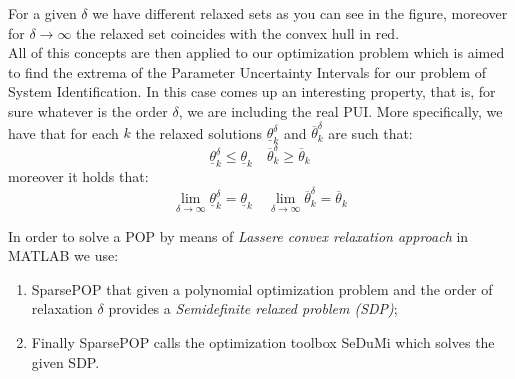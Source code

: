 For a given $\delta$ we have different relaxed sets as you can see in the figure, moreover for $\delta\to\infty$ the relaxed set coincides with the convex hull in red.\\
All of this concepts are then applied to our optimization problem which is aimed to find the extrema of the Parameter Uncertainty Intervals for our problem of System Identification. In this case comes up an interesting property, that is, for sure whatever is the order $\delta$, we are including the real PUI. More specifically, we have that for each $k$ the relaxed solutions $\underline{\theta}_k^{\delta}$ and $\overline{\theta}_k^{\delta}$ are such that:
{\large{
    \begin{equation}
        \underline{\theta}_k^{\delta} \le \underline{\theta}_k
        \quad 
        \overline{\theta}_k^{\delta} \ge \overline{\theta}_k
    \end{equation}
}}
moreover it holds that: 
\begin{equation}
    \lim_{\delta\to\infty} \underline{\theta}_k^{\delta} = \underline{\theta}_k \quad
    \lim_{\delta\to\infty} \overline{\theta}_k^{\delta} = \overline{\theta}_k
\end{equation}

\noindent
In order to solve a POP by means of \textit{Lassere convex  relaxation approach} in MATLAB we use:
\begin{enumerate}
    \item \textsf{SparsePOP} that given a polynomial optimization problem and the order of relaxation $\delta$ provides a \textit{Semidefinite relaxed problem (SDP)};
    \item Finally \textsf{SparsePOP} calls the optimization toolbox \textsf{SeDuMi} which solves  the given SDP. 
\end{enumerate}

